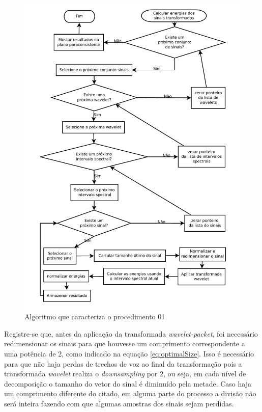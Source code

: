 		\begin{figure}[H]
			\centering
			\includegraphics[width=1\linewidth]{images/AlgoProcedure01.pdf}
			\caption{Algoritmo que caracteriza o procedimento 01}
			\label{fig:experiment01Algo}
		\end{figure}
		
		\par Registre-se que, antes da aplicação da transformada \textit{wavelet-packet}, foi necessário redimensionar os sinais para que houvesse um comprimento correspondente a uma potência de 2, como indicado na equação \ref{eq:optimalSize}. Isso é necessário para que não haja perdas de trechos de voz ao final da transformação pois a transformada \textit{wavelet} realiza o \textit{downsampling} por 2, ou seja, em cada nível de decomposição o tamanho do vetor do sinal é diminuído pela metade. Caso haja um comprimento diferente do citado, em alguma parte do processo a divisão não será inteira fazendo com que algumas amostras dos sinais sejam perdidas.
				
